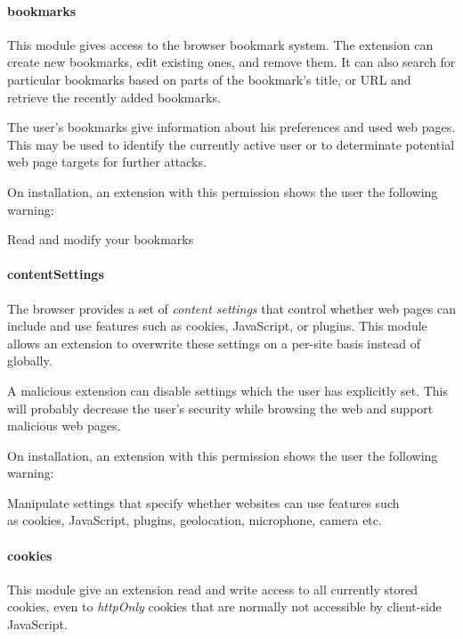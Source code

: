 \paragraph{bookmarks} 
	This module gives access to the browser bookmark system. The extension can create new bookmarks, edit existing ones, and remove them. It can also search for particular bookmarks based on parts of the bookmark's title, or URL and retrieve the recently added bookmarks.
	
	The user's bookmarks give information about his preferences and used web pages. This may be used to identify the currently active user or to determinate potential web page targets for further attacks.
	
	On installation, an extension with this permission shows the user the following warning:
	\begin{permissionwarning}
		Read and modify your bookmarks
	\end{permissionwarning}
	
\paragraph{contentSettings} 
	The browser provides a set of \textit{content settings} that control whether web pages can include and use features such as cookies, JavaScript, or plugins. This module  allows an extension to overwrite these settings on a per-site basis instead of globally.
	
	A malicious extension can disable settings which the user has explicitly set. This will probably decrease the user's security while browsing the web and support malicious web pages.
	
	On installation, an extension with this permission shows the user the following warning:
	\begin{permissionwarning}
		Manipulate settings that specify whether websites can use features such\\as cookies, JavaScript, plugins, geolocation, microphone, camera etc.
	\end{permissionwarning}
	
\paragraph{cookies} 
	This module give an extension read and write access to all currently stored cookies, even to \textit{httpOnly} cookies that are normally not accessible by client-side JavaScript.
	
